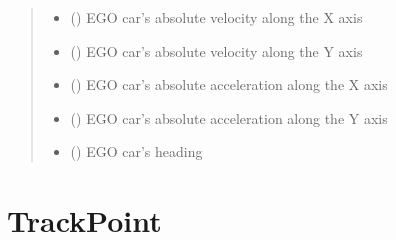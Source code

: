 \documentclass[letterpaper,10pt,english]{Reference manual}
\begin{document}
\begin{fulllineitems}
\begin{quote}
\begin{description}
\begin{itemize}
\item {} 
 () \textendash{} EGO car’s absolute velocity along the X axis

\item {} 
 () \textendash{} EGO car’s absolute velocity along the Y axis

\item {} 
 () \textendash{} EGO car’s absolute acceleration along the X axis

\item {} 
 () \textendash{} EGO car’s absolute acceleration along the Y axis

\item {} 
 () \textendash{} EGO car’s heading

\end{itemize}

\end{description}\end{quote}

\end{fulllineitems}



\section{TrackPoint}
\label{\detokenize{datacontainers:trackpoint}}
\end{document}
